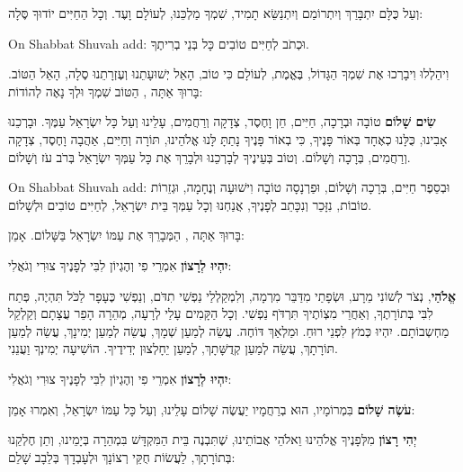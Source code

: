 וְעַל כֻּלָּם יִתְבָּרַךְ וְיִתְרוֹמַם וְיִתְנַשֵּׂא תָמִיד, שִׁמְךָ מַלְכֵּנוּ, לְעוֹלָם וָעֶד. וְכָל הַחַיִּים יוֹדוּךָ סֶּלָה:

\begin{seasonal}{On Shabbat Shuvah add:}
וּכְתֹב לְחַיִּים טוֹבִים כָּל בְּנֵי בְרִיתֶךָ.
\end{seasonal}

וִיהַלְלוּ וִיבָרְכוּ אֶת שִׁמְךָ הַגָּדוֹל, בֶּאֱמֶת, לְעוֹלָם כִּי טוֹב, הָאֵל יְשׁוּעָתֵנוּ וְעֶזְרָתֵנוּ סֶלָה, הָאֵל הַטּוֹב. בָּרוּךְ אַתָּה \Shem{}, הַטּוֹב שִׁמְךָ וּלְךָ נָאֶה לְהוֹדוֹת:

\textbf{שִׂים שָׁלוֹם} טוֹבָה וּבְרָכָה, חַיִּים, חֵן וָחֶסֶד, צְדָקָה וְרַחֲמִים, עָלֵינוּ וְעַל כָּל יִשְׂרָאֵל עַמֶּךָ. וּבָרְכֵנוּ אָבִינוּ, כֻּלָּנוּ כְאֶחָד בְּאוֹר פָּנֶיךָ, כִּי בְאוֹר פָּנֶיךָ נָתַתָּ לָּנוּ \Shem{} אֱלֹהֵינוּ, תּוֹרָה וְחַיִּים, אַהֲבָה וָחֶסֶד, צְדָקָה וְרַחֲמִים, בְּרָכָה וְשָׁלוֹם. וְטוֹב בְּעֵינֶיךָ לְבָרְכֵנוּ וּלְבָרֵךְ אֶת כָּל עַמְּךָ יִשְׂרָאֵל בְּרֹב עֹז וְשָׁלוֹם.

\begin{seasonal}{On Shabbat Shuvah add:}
וּבְסֵפֶר חַיִּים, בְּרָכָה וְשָׁלוֹם, וּפַרְנָסָה טוֹבָה וִישׁוּעָה וְנֶחָמָה, וּגְזֵרוֹת טוֹבוֹת, נִזָּכֵר וְנִכָּתֵב לְפָנֶיךָ, אֲנַחְנוּ וְכָל עַמְּךָ בֵּית יִשְׂרָאֵל, לְחַיִּים טוֹבִים וּלְשָׁלוֹם.
\end{seasonal}

בָּרוּךְ אַתָּה \Shem{}, הַמְּבָרֵךְ אֶת עַמּוֹ יִשְׂרָאֵל בַּשָּׁלוֹם. אָמֵן:

\textbf{יִהְיוּ לְרָצוֹן} אִמְרֵי פִי וְהֶגְיוֹן לִבִּי לְפָנֶיךָ \Shem{} צוּרִי וְגֹאֲלִי:

\textbf{אֱלֹהַי}, נְצֹר לְשׁוֹנִי מֵרָע, וּשְׂפָתַי מִדַּבֵּר מִרְמָה, וְלִמְקַלְלַי נַפְשִׁי תִדֹּם, וְנַפְשִׁי כֶּעָפָר לַכֹּל תִּהְיֶה, פְּתַח לִבִּי בְּתוֹרָתֶךָ, וְאַחֲרֵי מִצְוֹתֶיךָ תִּרְדֹּף נַפְשִׁי. וְכָל הַקָּמִים עָלַי לְרָעָה, מְהֵרָה הָפֵר עֲצָתָם וְקַלְקֵל מַחְשְבוֹתָם. יִהְיוּ כְּמֹץ לִפְנֵי רוּחַ. וּמַלְאַךְ \Shem{} דּוֹחֶה. עֲשֵׂה לְמַעַן שְׁמָךְ, עֲשֵׂה לְמַעַן יְמִינָךְ, עֲשֵׂה לְמַעַן תּוֹרָתָךְ, עֲשֵׂה לְמַעַן קְדֻשָּׁתָךְ, לְמַעַן יֵחָלְצוּן יְדִידֶיךָ. הוֹשִׁיעָה יְמִינְךָ וַעֲנֵנִי.

\textbf{יִהְיוּ לְרָצוֹן} אִמְרֵי פִי וְהֶגְיוֹן לִבִּי לְפָנֶיךָ \Shem{} צוּרִי וְגֹאֲלִי:

\textbf{עֹשֶׂה שָׁלוֹם} בִּמְרוֹמָיו, הוּא בְרַחֲמָיו יַעֲשֶׂה שָׁלוֹם עָלֵינוּ, וְעַל כָּל עַמּוֹ יִשְׂרָאֵל, וְאִמְרוּ אָמֵן:

\textbf{יְהִי רָצוֹן} מִלְּפָנֶיךָ \Shem{} אֱלֹהֵינוּ וֵאלֹהֵי אֲבוֹתֵינוּ, שֶׁתִּבְנֶה בֵּית הַמִּקְדָּשׁ בִּמְהֵרָה בְּיָמֵינוּ, וְתֵן חֶלְקֵנוּ בְּתוֹרָתָךְ, לַעֲשׂוֹת חֻקֵּי רְצוֹנָךְ וּלְעָבְדָךְ בְּלֵבָב שָׁלֵם:
